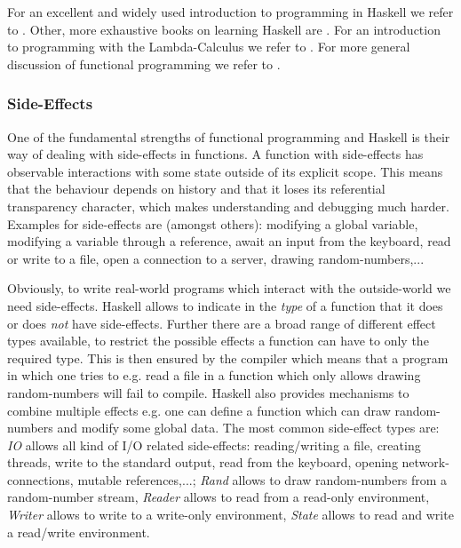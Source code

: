 For an excellent and widely used introduction to programming in Haskell we refer to \cite{hutton_programming_2016}. Other, more exhaustive books on learning Haskell are \cite{lipovaca_learn_2011, allen_haskell_2016}. For an introduction to programming with the Lambda-Calculus we refer to \cite{michaelson_introduction_2011}. For more general discussion of functional programming we refer to \cite{hughes_why_1989, maclennan_functional_1990, hudak_history_2007}.

\subsubsection{Side-Effects}
One of the fundamental strengths of functional programming and Haskell is their way of dealing with side-effects in functions. A function with side-effects has observable interactions with some state outside of its explicit scope. This means that the behaviour depends on history and that it loses its referential transparency character, which makes understanding and debugging much harder. Examples for side-effects are (amongst others): modifying a global variable, modifying a variable through a reference, await an input from the keyboard, read or write to a file, open a connection to a server, drawing random-numbers,...

Obviously, to write real-world programs which interact with the outside-world we need side-effects. Haskell allows to indicate in the \textit{type} of a function that it does or does \textit{not} have side-effects. Further there are a broad range of different effect types available, to restrict the possible effects a function can have to only the required type. This is then ensured by the compiler which means that a program in which one tries to e.g. read a file in a function which only allows drawing random-numbers will fail to compile. Haskell also provides mechanisms to combine multiple effects e.g. one can define a function which can draw random-numbers and modify some global data. The most common side-effect types are: \textit{IO} allows all kind of I/O related side-effects: reading/writing a file, creating threads, write to the standard output, read from the keyboard, opening network-connections, mutable references,...; \textit{Rand} allows to draw random-numbers from a random-number stream, \textit{Reader} allows to read from a read-only environment, \textit{Writer} allows to write to a write-only environment, \textit{State} allows to read and write a read/write environment.


